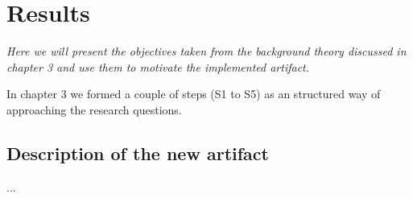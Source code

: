 \chapter{Results}

\emph{Here we will present the objectives taken from the background theory discussed in chapter 3 and use them to motivate the implemented artifact.}

In chapter 3 we formed a couple of steps (S1 to S5) as an structured way of approaching the research questions.

\section{Description of the new artifact}

...
